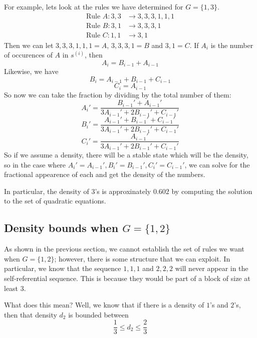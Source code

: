\documentclass[runningheads,a4paper]{llncs}
\begin{document}
For example, lets look at the rules we have determined for $G = \{ 1, 3 \}$. 
\begin{align*}
\text{Rule }A: 3,3 &\to 3,3,3,1,1,1 \\
\text{Rule }B: 3,1 &\to 3,3,3,1\\
\text{Rule }C: 1,1 &\to 3,1
\end{align*}
Then we can let $3,3,3,1,1,1 = A$, $3,3,3,1 = B$ and $3, 1 = C$. If $A_i$ is the number of occurences of $A$ in $s^{(i)}$, then 
\[ A_i = B_{i-1} + A_{i-1} \]
Likewise, we have
\[ B_i = A_{i-1} + B_{i-1} + C_{i-1} \]
\[ C_i = A_{i-1} \]
So now we can take the fraction by dividing by the total number of them:
\[ A_i' = \dfrac{B_{i-1}' + A_{i-1}'}{3A_{i-1}' + 2B_{i-1}' + C_{i-1}'} \]
\[ B_i' = \dfrac{A_{i-1}' + B_{i-1}' + C_{i-1}'}{3A_{i-1}' + 2B_{i-1}' + C_{i-1}'} \]
\[ C_i' = \dfrac{A_{i-1}'}{3A_{i-1}' + 2B_{i-1}' + C_{i-1}'} \]
So if we assume a density, there will be a stable state which will be the density, so in the case where $A_i'=A_{i-1}', B_i' = B_{i-1}', C_i'=C_{i-1}'$, we can solve for the fractional appearence of each and get the density of the numbers.

In particular, the density of 3's is approxinately $0.602$ by computing the solution to the set of quadratic equations.

\subsection{Density bounds when $G = \{1, 2\}$}

As shown in the previous section, we cannot establish the set of rules we want when $G = \{1 , 2\}$; however, there is some structure that we can exploit. In particular, we know that the sequence $1, 1, 1$ and $2, 2, 2$ will never appear in the self-referential sequence. This is because they would be part of a block of size at least $3$. 

What does this mean? Well, we know that if there is a density of $1$'s and $2$'s, then that density $d_2$ is bounded between 
\[ \dfrac{1}{3} \leq d_2 \leq \dfrac{2}{3} \]
\end{document}
